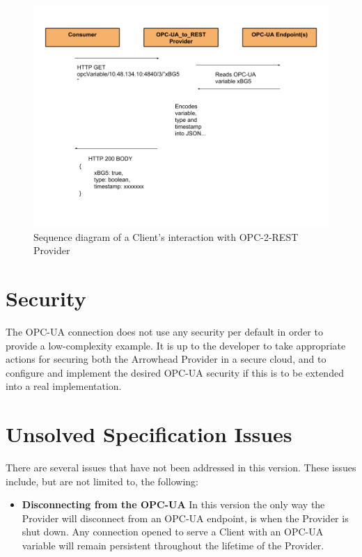 \documentclass[a4paper]{arrowhead}
\begin{document}
\begin{figure}[h]
  \center
  \includegraphics[scale=0.4]{fig/SysD - Sequence diagram.png}
  \caption{Sequence diagram of a Client's interaction with OPC-2-REST Provider}
  \label{fig:sysd}
\end{figure}

\newpage

\section{Security}
\label{sec:security}
The OPC-UA connection does not use any security per default in order to provide a low-complexity example. It is up to the developer to take appropriate actions for securing both the Arrowhead Provider in a secure cloud, and to configure and implement the desired OPC-UA security if this is to be extended into a real implementation.


\newpage

\section{Unsolved Specification Issues}

There are several issues that have not been addressed in this version.
These issues include, but are not limited to, the following:

\begin{itemize}
  \item \textbf{Disconnecting from the OPC-UA} In this version the only way the Provider will disconnect from an OPC-UA endpoint, is when the Provider is shut down. Any connection opened to serve a Client with an OPC-UA variable will remain persistent throughout the lifetime of the Provider.
\end{itemize}
\end{document}
